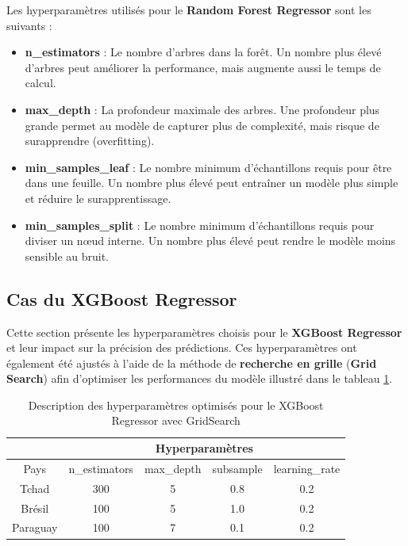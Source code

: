 Les hyperparamètres utilisés pour le \textbf{Random Forest Regressor} sont les suivants :
\begin{itemize}
	\item \textbf{n\_estimators} : Le nombre d'arbres dans la forêt. Un nombre plus élevé d'arbres peut améliorer la performance, mais augmente aussi le temps de calcul.
	\item \textbf{max\_depth} : La profondeur maximale des arbres. Une profondeur plus grande permet au modèle de capturer plus de complexité, mais risque de surapprendre (overfitting).
	\item \textbf{min\_samples\_leaf} : Le nombre minimum d'échantillons requis pour être dans une feuille. Un nombre plus élevé peut entraîner un modèle plus simple et réduire le surapprentissage.
	\item \textbf{min\_samples\_split} : Le nombre minimum d'échantillons requis pour diviser un nœud interne. Un nombre plus élevé peut rendre le modèle moins sensible au bruit.
\end{itemize}

\subsection{Cas du XGBoost Regressor}
Cette section présente les hyperparamètres choisis pour le \textbf{XGBoost Regressor} et leur impact sur la précision des prédictions. Ces hyperparamètres ont également été ajustés à l’aide de la méthode de \textbf{recherche en grille} (\textbf{Grid Search}) afin d’optimiser les performances du modèle illustré dans le tableau \ref{tab:grid-search-xb}.

\begin{table}[!hbt]
	\centering
	\caption{Description des hyperparamètres optimisés pour le XGBoost Regressor avec GridSearch}
	\label{tab:grid-search-xb}
	\begin{tabular}{|c|c|c|c|c|}
		\hline
		& \multicolumn{4}{c|}{Hyperparamètres} \\
		\hline
		Pays & \textsf{n\_estimators} & \textsf{max\_depth} & \textsf{subsample} & \textsf{learning\_rate} \\
		\hline
		Tchad & 300 & 5 & 0.8 & 0.2 \\
		\hline
		Brésil & 100 & 5 & 1.0 & 0.2 \\
		\hline
		Paraguay & 100 & 7 & 0.1 & 0.2 \\
		\hline
	\end{tabular}
\end{table}

